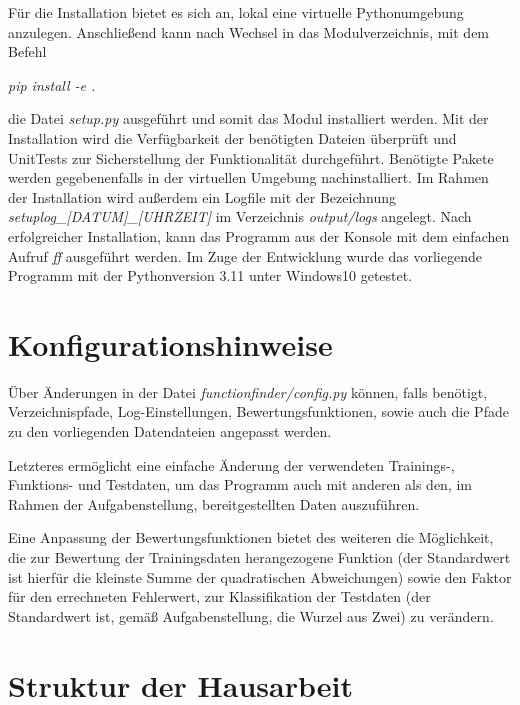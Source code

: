 \begin{tabular}{c}  %

\end{tabular}


Für die Installation bietet es sich an, lokal eine virtuelle Pythonumgebung anzulegen. Anschließend kann nach Wechsel in das Modulverzeichnis, mit dem Befehl
\begin{center}\emph{pip install -e .}\end{center}
die Datei \emph{setup.py} ausgeführt und somit das Modul installiert werden.
Mit der Installation wird die Verfügbarkeit der benötigten Dateien überprüft und UnitTests zur Sicherstellung der Funktionalität durchgeführt. Benötigte Pakete werden gegebenenfalls in der virtuellen Umgebung nachinstalliert. Im Rahmen der Installation wird außerdem ein Logfile mit der Bezeichnung \emph{setuplog\_[DATUM]\_[UHRZEIT]} im Verzeichnis \emph{output/logs} angelegt.
Nach erfolgreicher Installation, kann das Programm aus der Konsole mit dem einfachen Aufruf \emph{ff} ausgeführt werden.
Im Zuge der Entwicklung wurde das vorliegende Programm mit der Pythonversion 3.11 unter Windows10 getestet.

\section{Konfigurationshinweise}

Über Änderungen in der Datei \emph{functionfinder/config.py} können, falls benötigt, Verzeichnispfade, Log-Einstellungen, Bewertungsfunktionen, sowie auch die Pfade zu den vorliegenden Datendateien angepasst werden.

Letzteres ermöglicht eine einfache Änderung der verwendeten Trainings-, Funktions- und Testdaten, um das Programm auch mit anderen als den, im Rahmen der Aufgabenstellung, bereitgestellten Daten auszuführen.

Eine Anpassung der Bewertungsfunktionen bietet des weiteren die Möglichkeit, die zur Bewertung der Trainingsdaten herangezogene Funktion (der Standardwert ist hierfür die kleinste Summe der quadratischen Abweichungen) sowie den Faktor für den errechneten Fehlerwert, zur Klassifikation der Testdaten (der Standardwert ist, gemäß Aufgabenstellung, die Wurzel aus Zwei) zu verändern.

\section{Struktur der Hausarbeit}

